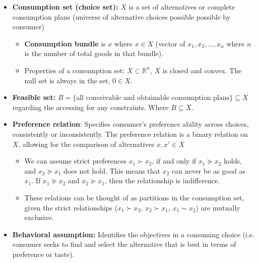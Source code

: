 \documentclass{article}
\begin{document}
\begin{itemize}
    \item \textbf{Consumption set (choice set):}  $X$ is a set of alternatives or complete consumption plans (universe of alternative choices possible possible by consumer)
    \begin{itemize}
        \item \textbf{Consumption bundle} is $x$ where $x \in X$ (vector of $x_{1}, x_{2}, \ldots, x_{n}$ where $n$ is the number of total goods in that bundle).
        \item Properties of a consumption set: $X \subset \mathbb{R}^{n}$, $X$ is closed and convex. The null set is always in the set, $0 \in X$.
    \end{itemize}
    
    \item \textbf{Feasible set:} $B = \{ \text{all conceivable and obtainable consumption plans} \} \subseteq X$ regarding the accessing for any constraints. Where $B \subseteq X$.

    \item \textbf{Preference relation}: Specifies consumer's preference ability across choices, consistently or inconsistently. The preference relation is a binary relation on $X$, allowing for the comparison of alternatives $x, x' \in X$
    \begin{itemize}
        \item We can assume strict preferences $x_{1} \succ x_{2}$, if and only if $x_{1} \succeq x_{2}$ holds, and $x_{2} \succeq x_{1}$ does not hold. This means that $x_{2}$ can never be as good as $x_{1}$. If $x_{1} \succeq x_{2}$ and $x_{2} \succeq x_{1}$, then the relationship is indifference.
        \item These relations can be thought of as partitions in the consumption set, given the strict relationships ($x_{1} \succ x_{2}$, $x_{2} \succ x_{1}$, $x_{1} \sim x_{2}$) are mutually exclusive. 
    \end{itemize}
    
    \item \textbf{Behavioral assumption:} Identifies the objectives in a consuming choice (i.e. consumer seeks to find and select the alternative that is best in terms of preference or taste). 


\end{itemize}
\end{document}
